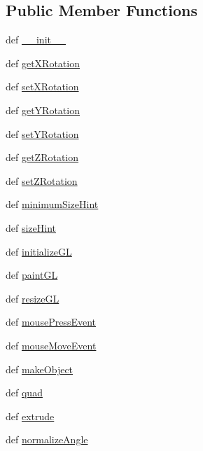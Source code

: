 \subsection*{Public Member Functions}
\begin{DoxyCompactItemize}
\item 
def \hyperlink{classhelloglwidget_1_1HelloGLWidget_afb7d45802270b9d4c628243ad3bd75e0}{\+\_\+\+\_\+init\+\_\+\+\_\+}
\item 
def \hyperlink{classhelloglwidget_1_1HelloGLWidget_a76980f298c488571d494a9c3ad499177}{get\+X\+Rotation}
\item 
def \hyperlink{classhelloglwidget_1_1HelloGLWidget_a491c673f575adb3375902cf36ad5fd55}{set\+X\+Rotation}
\item 
def \hyperlink{classhelloglwidget_1_1HelloGLWidget_a279ed6199381fe3c56f4284d464b2b77}{get\+Y\+Rotation}
\item 
def \hyperlink{classhelloglwidget_1_1HelloGLWidget_a0a7f5047394618b28866bb29e6e7dd2e}{set\+Y\+Rotation}
\item 
def \hyperlink{classhelloglwidget_1_1HelloGLWidget_a6247f65654ae3f5c705fa07e8b428890}{get\+Z\+Rotation}
\item 
def \hyperlink{classhelloglwidget_1_1HelloGLWidget_a329b2c8f2060d81a27982f1024efbf1b}{set\+Z\+Rotation}
\item 
def \hyperlink{classhelloglwidget_1_1HelloGLWidget_aac6aebc0c53732eef15c414d9b4c4e6f}{minimum\+Size\+Hint}
\item 
def \hyperlink{classhelloglwidget_1_1HelloGLWidget_ab1697299a1f913e6be0f454f6ca09ec1}{size\+Hint}
\item 
def \hyperlink{classhelloglwidget_1_1HelloGLWidget_a99f4cb0e0d2b2b48d88b8eb315b79d57}{initialize\+G\+L}
\item 
def \hyperlink{classhelloglwidget_1_1HelloGLWidget_a3285f1219c3349093b50bec4efdc3447}{paint\+G\+L}
\item 
def \hyperlink{classhelloglwidget_1_1HelloGLWidget_a6d48e3c8021d9d5fedc06531e7ab5cfe}{resize\+G\+L}
\item 
def \hyperlink{classhelloglwidget_1_1HelloGLWidget_af76a0343a067062cfecc79084165fc27}{mouse\+Press\+Event}
\item 
def \hyperlink{classhelloglwidget_1_1HelloGLWidget_a92e61cc5b55f017b182a32661339eb0a}{mouse\+Move\+Event}
\item 
def \hyperlink{classhelloglwidget_1_1HelloGLWidget_a0d01abf72377b9e83ecf411d2a07da39}{make\+Object}
\item 
def \hyperlink{classhelloglwidget_1_1HelloGLWidget_a95cef3d389c2da4e87c80bf26863d78a}{quad}
\item 
def \hyperlink{classhelloglwidget_1_1HelloGLWidget_a6b73adf17b7f371811f7ff40d9db5da2}{extrude}
\item 
def \hyperlink{classhelloglwidget_1_1HelloGLWidget_aa287826d19a64dcc7366a809442b1915}{normalize\+Angle}
\end{DoxyCompactItemize}
